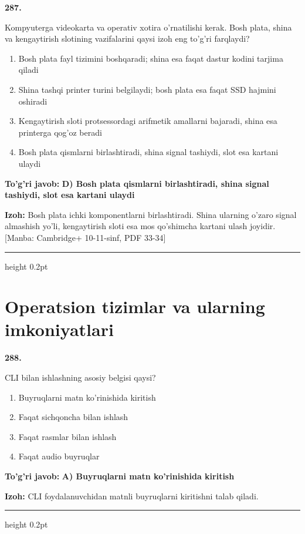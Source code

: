 \documentclass[10pt,a4paper]{article}
\begin{document}
{\bfseries\sffamily\color{ink} 287.}
\par
Kompyuterga videokarta va operativ xotira o'rnatilishi kerak. Bosh plata, shina va kengaytirish slotining vazifalarini qaysi izoh eng to'g'ri farqlaydi?
\begin{enumerate}[label=\Alph*),leftmargin=9mm]
\item Bosh plata fayl tizimini boshqaradi; shina esa faqat dastur kodini tarjima qiladi
\item Shina tashqi printer turini belgilaydi; bosh plata esa faqat SSD hajmini oshiradi
\item Kengaytirish sloti protsessordagi arifmetik amallarni bajaradi, shina esa printerga qog'oz beradi
\item Bosh plata qismlarni birlashtiradi, shina signal tashiydi, slot esa kartani ulaydi
\end{enumerate}
\begin{tcolorbox}[enhanced,breakable,colback=teal!4,colframe=teal!60!black,boxrule=0.45pt,arc=1.2mm,left=2.7mm,right=2.7mm,top=1.8mm,bottom=1.8mm,before skip=2mm,after skip=2mm]
{\bfseries\sffamily\color{teal}To'g'ri javob:} \textbf{D) Bosh plata qismlarni birlashtiradi, shina signal tashiydi, slot esa kartani ulaydi}
\par\smallskip
{\bfseries Izoh:} Bosh plata ichki komponentlarni birlashtiradi. Shina ularning o'zaro signal almashish yo'li, kengaytirish sloti esa mos qo'shimcha kartani ulash joyidir. [Manba: Cambridge+ 10-11-sinf, PDF 33-34]
\end{tcolorbox}
\vspace{2mm}\hrule height 0.2pt\vspace{3mm}
\clearpage
\section{Operatsion tizimlar va ularning imkoniyatlari}

{\bfseries\sffamily\color{ink} 288.}
\par
CLI bilan ishlashning asosiy belgisi qaysi?
\begin{enumerate}[label=\Alph*),leftmargin=9mm]
\item Buyruqlarni matn ko'rinishida kiritish
\item Faqat sichqoncha bilan ishlash
\item Faqat rasmlar bilan ishlash
\item Faqat audio buyruqlar
\end{enumerate}
\begin{tcolorbox}[enhanced,breakable,colback=teal!4,colframe=teal!60!black,boxrule=0.45pt,arc=1.2mm,left=2.7mm,right=2.7mm,top=1.8mm,bottom=1.8mm,before skip=2mm,after skip=2mm]
{\bfseries\sffamily\color{teal}To'g'ri javob:} \textbf{A) Buyruqlarni matn ko'rinishida kiritish}
\par\smallskip
{\bfseries Izoh:} CLI foydalanuvchidan matnli buyruqlarni kiritishni talab qiladi.
\end{tcolorbox}
\vspace{2mm}\hrule height 0.2pt\vspace{3mm}
\end{document}
